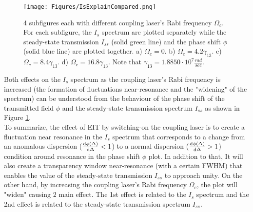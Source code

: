 \begin{figure}[h!]
    \centering
    \texttt{[image: Figures/IsExplainCompared.png]}
    \caption{4 subfigures each with different coupling laser's Rabi frequency $\Omega_{c}$. For each subfigure, the $I_{s}$ spectrum are plotted separately while the steady-state transmission $I_{ss}$ (solid green line) and the phase shift $\phi$ (solid blue line) are plotted together. a) $\Omega_{c} = 0$. b) $\Omega_{c} = 4.2\gamma_{13}$. c) $\Omega_{c} = 8.4\gamma_{13}$. d) $\Omega_{c} = 16.8\gamma_{13}$. Note that $\gamma_{13} = 1.8850 \cdot 10^{7} \frac{rad}{sec}$.}
    \label{fig: Is compared to transmission & phase shift}
\end{figure}

Both effects on the $I_{s}$ spectrum as the coupling laser's Rabi frequency is increased (the formation of fluctuations near-resonance and the "widening" of the spectrum) can be understood from the behaviour of the phase shift of the transmitted field $\phi$ and the steady-state transmission spectrum $I_{ss}$ as shown in Figure \ref{fig: Is compared to transmission & phase shift}.\\


To summarize, the effect of EIT by switching-on the coupling laser is to create a fluctuation near resonance in the $I_{s}$ spectrum that corresponds to a change from an anomalous dispersion ($\dv{\phi(\Delta)}{\Delta} < 1$) to a normal dispersion ($\dv{\phi(\Delta)}{\Delta} > 1$) condition around resonance in the phase shift $\phi$ plot. In addition to that, It will also create a transparency window near-resonance (with a certain FWHM) that enables the value of the steady-state transmission $I_{ss}$ to approach unity. On the other hand, by increasing the coupling laser's Rabi frequency $\Omega_{c}$, the plot will "widen" causing 2 main effect. The 1st effect is related to the $I_{s}$ spectrum and the 2nd effect is related to the steady-state transmission spectrum $I_{ss}$.\\

